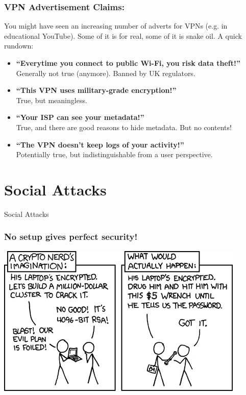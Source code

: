 \documentclass[aspectratio=1610,dvipsnames]{beamer}
\begin{document}
\begin{frame}
\frametitle{VPN Advertisement Claims:}

You might have seen an increasing number of adverts for VPNs (e.g. in educational YouTube). Some of it is for real, some of it is snake oil. A quick rundown:
\bigskip

\begin{itemize}
\pause\item \textbf{``Everytime you connect to public Wi-Fi, you risk data theft!''}\\
Generally not true (anymore). Banned by UK regulators.

\pause \item \textbf{``This VPN uses military-grade encryption!''}\\
True, but meaningless.

\pause \item \textbf{``Your ISP can see your metadata!''}\\True, and there are good reasons to hide metadata. But no contents!

\pause \item \textbf{``The VPN doesn't keep logs of your activity!''}\\Potentially true, but indistinguishable from a user perspective.
\end{itemize}
\end{frame}


\section{Social Attacks}
\begin{frame}
\begin{center}
\huge Social Attacks
\end{center}
\end{frame}

\begin{frame}
\frametitle{No setup gives perfect security!}
\begin{center}
\includegraphics[height=0.65\textheight,keepaspectratio]{images/security.png} 
\end{center}
\end{frame}
\end{document}
